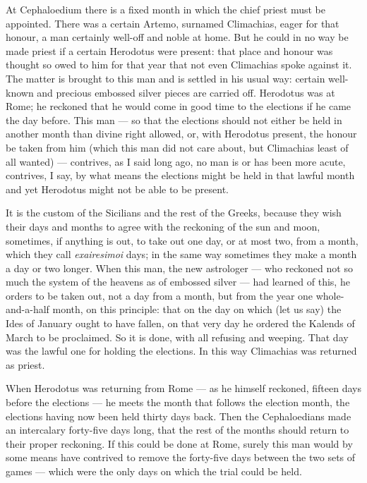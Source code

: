  At Cephaloedium there is a fixed month in which the chief priest must be appointed. There was a certain Artemo, surnamed Climachias, eager for that honour, a man certainly well-off and noble at home. But he could in no way be made priest if a certain Herodotus were present: that place and honour was thought so owed to him for that year that not even Climachias spoke against it. The matter is brought to this man and is settled in his usual way: certain well-known and precious embossed silver pieces are carried off. Herodotus was at Rome; he reckoned that he would come in good time to the elections if he came the day before. This man --- so that the elections should not either be held in another month than divine right allowed, or, with Herodotus present, the honour be taken from him (which this man did not care about, but Climachias least of all wanted) --- contrives, as I said long ago, no man is or has been more acute, contrives, I say, by what means the elections might be held in that lawful month and yet Herodotus might not be able to be present.

 It is the custom of the Sicilians and the rest of the Greeks, because they wish their days and months to agree with the reckoning of the sun and moon, sometimes, if anything is out, to take out one day, or at most two, from a month, which they call \textit{exairesimoi} days; in the same way sometimes they make a month a day or two longer. When this man, the new astrologer --- who reckoned not so much the system of the heavens as of embossed silver --- had learned of this, he orders to be taken out, not a day from a month, but from the year one whole-and-a-half month, on this principle: that on the day on which (let us say) the Ides of January ought to have fallen, on that very day he ordered the Kalends of March to be proclaimed. So it is done, with all refusing and weeping. That day was the lawful one for holding the elections. In this way Climachias was returned as priest.

 When Herodotus was returning from Rome --- as he himself reckoned, fifteen days before the elections --- he meets the month that follows the election month, the elections having now been held thirty days back. Then the Cephaloedians made an intercalary forty-five days long, that the rest of the months should return to their proper reckoning. If this could be done at Rome, surely this man would by some means have contrived to remove the forty-five days between the two sets of games --- which were the only days on which the trial could be held.

